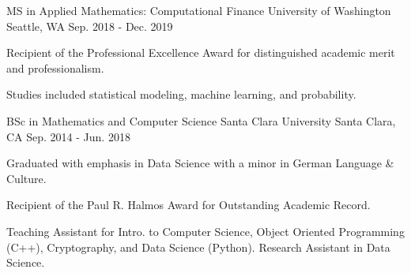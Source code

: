 
\begin{cventries}

  \cventry
    {MS in Applied Mathematics: Computational Finance} %
    {University of Washington} %
    {Seattle, WA} %
    {Sep. 2018 - Dec. 2019} %
    {
      \begin{cvitems} %
        \item {Recipient of the Professional Excellence Award for distinguished academic merit and professionalism.}
        \item {Studies included statistical modeling, machine learning, and probability.}
      \end{cvitems}
    }

  \cventry
    {BSc in Mathematics and Computer Science} %
    {Santa Clara University} %
    {Santa Clara, CA} %
    {Sep. 2014 - Jun. 2018} %
    {
      \begin{cvitems} %
        \item {Graduated with emphasis in Data Science with a minor in German Language \& Culture.}
        \item {Recipient of the Paul R. Halmos Award for Outstanding Academic Record.}
        \item {Teaching Assistant for Intro. to Computer Science, Object Oriented Programming (C++), Cryptography, and Data Science (Python). Research Assistant in Data Science.}
      \end{cvitems}
    }

\end{cventries}
